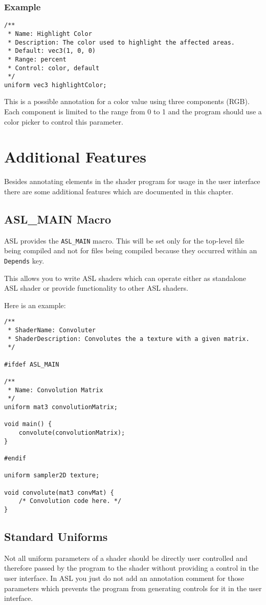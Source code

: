 \documentclass[11pt,a4paper]{scrreprt}
\begin{document}
\subsection{Example}
\begin{lstlisting}
/**
 * Name: Highlight Color
 * Description: The color used to highlight the affected areas.
 * Default: vec3(1, 0, 0)
 * Range: percent
 * Control: color, default
 */
uniform vec3 highlightColor;
\end{lstlisting}
This is a possible annotation for a color value using three components (RGB).  
Each component is limited to the range from 0 to 1 and the program should use 
a color picker to control this parameter.

\chapter{Additional Features}
Besides annotating elements in the shader program for usage in the user 
interface there are some additional features which are documented in this 
chapter.

\section{ASL\_MAIN Macro}
ASL provides the \lstinline$ASL_MAIN$ macro. This will be set only for the 
top-level file being compiled and not for files being compiled because they 
occurred within an \lstinline$Depends$ key.

This allows you to write ASL shaders which can operate either as standalone ASL 
shader or provide functionality to other ASL shaders.

Here is an example:
\begin{lstlisting}
/**
 * ShaderName: Convoluter
 * ShaderDescription: Convolutes the a texture with a given matrix.
 */

#ifdef ASL_MAIN

/**
 * Name: Convolution Matrix
 */
uniform mat3 convolutionMatrix;

void main() {
    convolute(convolutionMatrix);
}

#endif

uniform sampler2D texture;

void convolute(mat3 convMat) {
    /* Convolution code here. */
}
\end{lstlisting}

\section{Standard Uniforms}
Not all uniform parameters of a shader should be directly user controlled and 
therefore passed by the program to the shader without providing a control in the 
user interface. In ASL you just do not add an annotation comment for those 
parameters which prevents the program from generating controls for it in the 
user interface.
\end{document}
